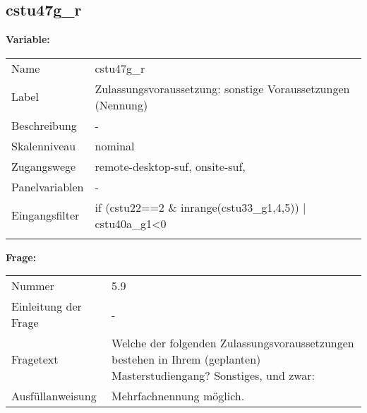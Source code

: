 	
	
	\subsection{cstu47g\_r}
	\label{subSection:cstu47g_r}

	\noindent\textbf{Variable:}\\
		\begin{tabular}{lL{11.3cm}}
			\label{tableVariable:cstu47g_r}
			Name & cstu47g\_r \\
			Label & Zulassungsvoraussetzung: sonstige Voraussetzungen (Nennung) \\
			Beschreibung & - \\
			Skalenniveau & nominal \\
			Zugangswege &
				remote-desktop-suf,
				onsite-suf,
 \\
			Panelvariablen & -
			 \\
			Eingangsfilter & if (cstu22==2 \& inrange(cstu33\_g1,4,5)) | cstu40a\_g1\textless{}0 \\
 \\
		\end{tabular}

		\vspace*{1 cm}
		\noindent\textbf{Frage:}\\
		\begin{tabular}{lL{11.3cm}}
			\label{tableQuestion:cstu47g_r}
			Nummer & 5.9 \\
			Einleitung der Frage & - \\
			Fragetext & Welche der folgenden Zulassungsvoraussetzungen bestehen in Ihrem (geplanten) Masterstudiengang?
Sonstiges, und zwar: \\
			Ausfüllanweisung & Mehrfachnennung möglich. \\
		\end{tabular}





